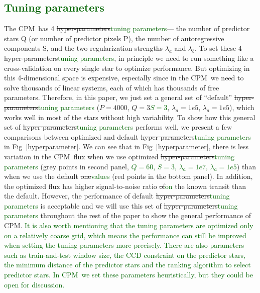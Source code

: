 \documentclass[12pt, preprint]{aastex}
\newcommand{\name}{CPM}
\newcommand{\revise}[1]{\textcolor{darkgreen}{#1}}
\newcommand{\remove}[1]{\sout{#1}}
\begin{document}
\subsection{\revise{Tuning parameters}}
The \name\ has 4 \remove{hyper-parameters}\revise{tuning parameters}--- 
  the number of predictor stars Q (or number of predictor pixels P), 
  the number of autoregressive components S, 
  and the two regularization strengths $\lambda_{a}$ and $\lambda_{b}$.
To set these 4 \remove{hyper-parameters}\revise{tuning parameters}, 
  in principle we need to run something like a cross-validation on every single star to optimize performance.
But optimizing in this 4-dimensional space is expensive, 
  especially since in the \name\ we need to solve thousands of linear systems, 
  each of which has thousands of free parameters. 
Therefore, in this paper, 
  we just set a general set of ``default'' \remove{hyper-parameters}\revise{tuning parameters} ($P=4000$, \remove{$Q=3$}\revise{$S=3$}, $\lambda_a=1e5$, $\lambda_a=1e5$), 
  which works well in most of the stars without high variability. 
To show how this general set of \remove{hyper-parameters}\revise{tuning parameters} performs well, 
  we present a few comparisons between optimized and default \remove{hyper-parameters}\revise{tuning parameters} 
  in Fig~\ref{hyperparameter}.
We can see that in Fig~\ref{hyperparameter}, 
  there is less variation in the \name\ flux 
  when we use optimized \remove{hyper-parameters}\revise{tuning parameters} (grey points in second panel, \revise{$Q=60$, $S=3$, $\lambda_a=1e7$, $\lambda_a=1e5$}) 
  than when we use the default \remove{one}\revise{values} (red points in the bottom panel). 
In addition, the optimized flux has higher signal-to-noise ratio \remove{of}\revise{on} the known transit than the default. 
However, the performance of default \remove{hyper-parameters}\revise{tuning parameters} is acceptable 
  and we will use this set of \remove{hyper-parameters}\revise{tuning parameters} throughout the rest of the paper 
  to show the general performance of \name. 
\revise{It is also worth mentioning that the tuning parameters are optimized only on a relatively coarse grid, which means the performance can still be improved when setting the tuning parameters more precisely.}
\revise{There are also parameters such as train-and-test window size, the CCD constraint on the predictor stars, the minimum distance of the predictor stars and the ranking algorithm to select predictor stars. In \name\ we set these parameters heuristically, but they could be open for discussion.}
  
\end{document}
